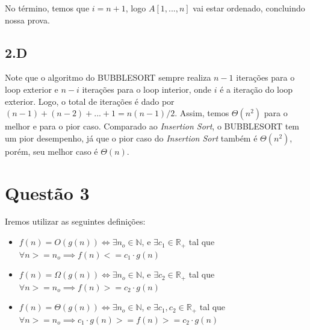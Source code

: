 \documentclass{article}
\begin{document}
No término, temos que $i=n+1$, logo $A[1,...,n]$ vai estar ordenado, concluindo nossa prova.

\subsection*{2.D}
Note que o algoritmo do BUBBLESORT sempre realiza $n-1$ iterações para o loop exterior e $n-i$ iterações
para o loop interior, onde $i$ é a iteração do loop exterior. Logo, o total de iterações é dado por
$(n-1)+(n-2)+...+1 = n(n-1)/2$. Assim, temos $\Theta(n^2)$ para o melhor e
para o pior caso. Comparado ao {\it Insertion Sort}, o BUBBLESORT tem um pior desempenho, já que o pior caso
do {\it Insertion Sort} também é $\Theta(n^2)$, porém, seu melhor caso é $\Theta(n)$.

\section*{Questão 3}
Iremos utilizar as seguintes definições:
\begin{itemize}
      \item $ f(n)=O(g(n))\iff \exists n_o \in \mathbb{N}$, e $\exists c_1 \in \mathbb{R}_+$ tal que $\forall n>=n_o \implies f(n) <= c_1 \cdot g(n)$
      \item $ f(n)=\Omega(g(n))\iff\exists n_o \in \mathbb{N}$, e $\exists c_2 \in \mathbb{R}_+$ tal que $\forall n>=n_o \implies f(n) >= c_2 \cdot g(n)$
      \item $ f(n)=\Theta(g(n))\iff\exists n_o \in \mathbb{N}$, e $\exists c_1,c_2 \in \mathbb{R}_+$ tal que
      $\forall n>=n_o \implies c_1 \cdot g(n) >= f(n) >= c_2 \cdot g(n)$
  \end{itemize}
\end{document}
